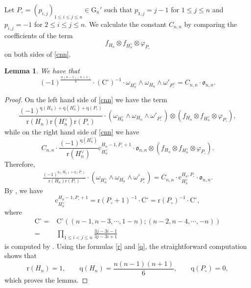 \documentclass[12pt, a4paper]{amsart}
\newcommand{\RC}{{\mathrm {C}}}
\newcommand{\RG}{{\mathrm {G}}}
\theoremstyle{Theorem}
\theoremstyle{Theorem}
\theoremstyle{Theorem}
\theoremstyle{Theorem}
\newtheorem{lemp}[prp]{Lemma}
\theoremstyle{Plain}
\theoremstyle{Definition}
\begin{document}
	Let $P_{\circ}=(p_{i,j})_{1\leq i\leq j\leq n}\in\RG_n'$ such that $p_{1,j}=j-1$ for $1\leq j\leq n$ and $p_{i,j}=-1$ for $2\leq i\leq j\leq n$. We calculate the constant $C_{n,n}$ by comparing the coefficients of the term
	\[
	f_{H_n}\otimes f_{H_n^{\vee}}\otimes \varphi_{P_{\circ}}
	\]
	on both sides of \eqref{cnn}. 
	
	\begin{lemp}We have that
		\label{lemA}
		\[
		(-1)^{\frac{n(n-1)(n+1)}{6}}\cdot(\RC^{\circ})^{-1}\cdot	\omega_{H^{\vee}_n}\wedge\omega_{H_n}\wedge\omega'_{P^{\vee}_{\circ}}=C_{n,n}\cdot\mathfrak{o}_{n,n}.
		\]
	\end{lemp}
	
	\begin{proof}
		On the left hand side of \eqref{cnn} we have the term
		\[
		\frac{(-1)^{\mathrm{q}(H_n)+\mathrm{q}(H_n^{\vee})+\mathrm{q}(P_{\circ})}}{\mathrm{r}(H_n)\mathrm{r}(H_n^{\vee})\mathrm{r}(P_{\circ})}\cdot(\omega_{H^{\vee}_n}\wedge\omega_{H_n}\wedge\omega'_{P^{\vee}_{\circ}})\otimes(f_{H_n}\otimes f_{H_n^{\vee}}\otimes \varphi_{P_{\circ}}),
		\]
		while on the right hand side of \eqref{cnn} we have 
		\[
		C_{n,n}\cdot\frac{(-1)^{\mathrm{q}(H_n^{\vee})}}{\mathrm{r}(H_n^{\vee})}\mathrm{c}_{H_n^{\vee}}^{H_n -1,P_{\circ}+1}\cdot\mathfrak{o}_{n,n}\otimes(f_{H_n}\otimes f_{H_n^{\vee}}\otimes \varphi_{P_{\circ}}).
		\]
		Therefore,
		\[
		\begin{aligned}
			\frac{(-1)^{\mathrm{q}(H_n)+\mathrm{q}(P_{\circ})}}{\mathrm{r}(H_n)\mathrm{r}(P_{\circ})}\cdot(\omega_{H^{\vee}_n}\wedge\omega_{H_n}\wedge\omega'_{P^{\vee}_{\circ}})=C_{n,n}\cdot\mathrm{c}_{H_n^{\vee}}^{H_n,P_{\circ}}\cdot\mathfrak{o}_{n,n}.
		\end{aligned}
		\]
		By \cite[Proposition 2.13(ii)]{IM}, we have
		\[
		\mathrm{c}^{H_n-1,P_{\circ}+1}_{H^{\vee}_n}=\mathrm{r}(P_{\circ}+1)^{-1}\cdot\mathrm{C}^{\circ}=\mathrm{r}(P_{\circ})^{-1}\cdot\mathrm{C}^{\circ},
		\]
		where
		\[
		\begin{aligned}
			\mathrm{C}^{\circ}=	&\mathrm{C}^{\circ}\left((n-1,n-3,\cdots,1-n);(n-2,n-4,\cdots,-n)\right)\\
			=&\prod_{1\leq i<j\leq n}\frac{3j-3i-1}{3j-3i+1}
		\end{aligned}
		\] 
		is computed by \cite[(2.37)]{IM}. Using the formulas \eqref{r} and \eqref{q}, the straightforward computation shows that
		\[
		\mathrm{r}(H_n)=1,\qquad\mathrm{q}(H_n)=\frac{n(n-1)(n+1)}{6},\qquad\mathrm{q}(P_{\circ})=0,
		\]
		which proves the lemma.
	\end{proof}
	
\end{document}
